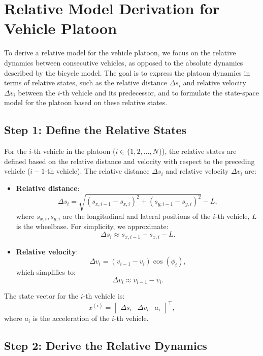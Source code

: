 \documentclass{article}
\begin{document}

\section{Relative Model Derivation for Vehicle Platoon}

To derive a relative model for the vehicle platoon, we focus on the relative dynamics between consecutive vehicles, as opposed to the absolute dynamics described by the bicycle model. The goal is to express the platoon dynamics in terms of relative states, such as the relative distance $\Delta s_i$ and relative velocity $\Delta v_i$ between the $i$-th vehicle and its predecessor, and to formulate the state-space model for the platoon based on these relative states.

\subsection{Step 1: Define the Relative States}

For the $i$-th vehicle in the platoon ($i \in \{1, 2, \dots, N\}$), the relative states are defined based on the relative distance and velocity with respect to the preceding vehicle ($i-1$-th vehicle). The relative distance $\Delta s_i$ and relative velocity $\Delta v_i$ are:

\begin{itemize}
\item \textbf{Relative distance}:
  \[
  \Delta s_i = \sqrt{(s_{x,i-1} - s_{x,i})^2 + (s_{y,i-1} - s_{y,i})^2} - L,
  \]
  where $s_{x,i}, s_{y,i}$ are the longitudinal and lateral positions of the $i$-th vehicle, $L$ is the wheelbase. For simplicity, we approximate:
  \[
  \Delta s_i \approx s_{x,i-1} - s_{x,i} - L.
  \]

\item \textbf{Relative velocity}:
  \[
  \Delta v_i = (v_{i-1} - v_i) \cos(\phi_i),
  \]
  which simplifies to:
  \[
  \Delta v_i \approx v_{i-1} - v_i.
  \]
\end{itemize}

The state vector for the $i$-th vehicle is:
\[
x^{(i)} = \begin{bmatrix} \Delta s_i & \Delta v_i & a_i \end{bmatrix}^\top,
\]
where $a_i$ is the acceleration of the $i$-th vehicle.

\subsection{Step 2: Derive the Relative Dynamics}
\end{document}
